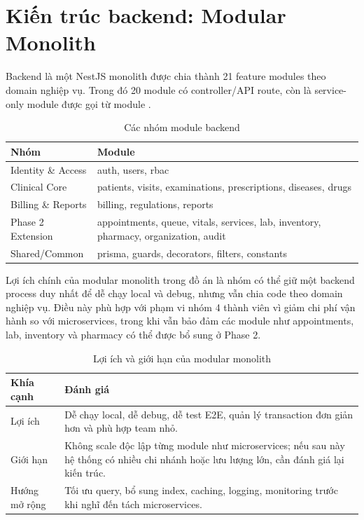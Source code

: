 \section{Kiến trúc backend: Modular Monolith}

Backend là một NestJS monolith được chia thành 21 feature modules theo domain nghiệp vụ. Trong đó 20 module có controller/API route, còn  là service-only module được gọi từ module .

\begin{table}[H]
\centering
\caption{Các nhóm module backend}
\begin{tabularx}{\textwidth}{|p{4cm}|X|}
\hline
\textbf{Nhóm} & \textbf{Module} \\
\hline
Identity \& Access & auth, users, rbac \\
\hline
Clinical Core & patients, visits, examinations, prescriptions, diseases, drugs \\
\hline
Billing \& Reports & billing, regulations, reports \\
\hline
Phase 2 Extension & appointments, queue, vitals, services, lab, inventory, pharmacy, organization, audit \\
\hline
Shared/Common & prisma, guards, decorators, filters, constants \\
\hline
\end{tabularx}
\end{table}
\noindent
Lợi ích chính của modular monolith trong đồ án là nhóm có thể giữ một backend process duy nhất để dễ chạy local và debug, nhưng vẫn chia code theo domain nghiệp vụ. Điều này phù hợp với phạm vi nhóm 4 thành viên vì giảm chi phí vận hành so với microservices, trong khi vẫn bảo đảm các module như appointments, lab, inventory và pharmacy có thể được bổ sung ở Phase 2.

\begin{table}[H]
\centering
\caption{Lợi ích và giới hạn của modular monolith}
\begin{tabularx}{\textwidth}{|p{4cm}|X|}
\hline
\textbf{Khía cạnh} & \textbf{Đánh giá} \\
\hline
Lợi ích & Dễ chạy local, dễ debug, dễ test E2E, quản lý transaction đơn giản hơn và phù hợp team nhỏ. \\
\hline
Giới hạn & Không scale độc lập từng module như microservices; nếu sau này hệ thống có nhiều chi nhánh hoặc lưu lượng lớn, cần đánh giá lại kiến trúc. \\
\hline
Hướng mở rộng & Tối ưu query, bổ sung index, caching, logging, monitoring trước khi nghĩ đến tách microservices. \\
\hline
\end{tabularx}
\end{table}

